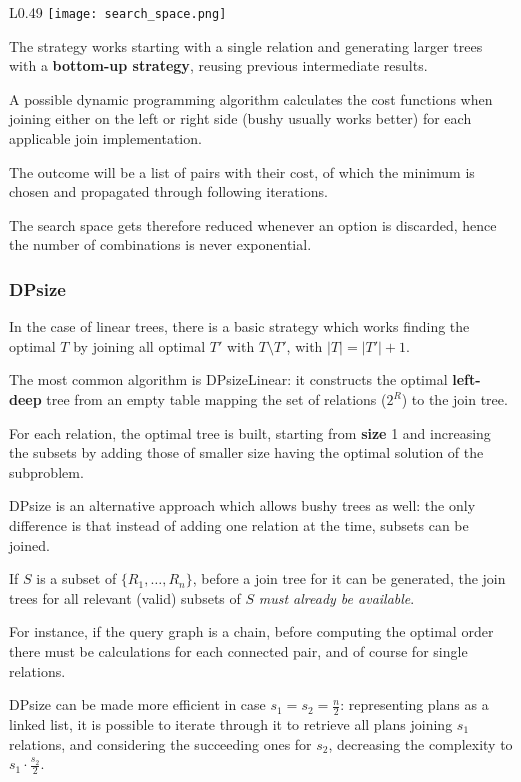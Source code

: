 \begin{wrapfigure}{L}{0.49\textwidth}
	\vspace{-10pt}
	\texttt{[image: search\_space.png]}
	\vspace{-40pt}
\end{wrapfigure}

The strategy works starting with a single relation and generating larger trees with a \textbf{bottom-up strategy}, reusing previous intermediate results.

A possible dynamic programming algorithm calculates the cost functions when joining either on the left or right side (bushy usually works better) for each applicable join implementation. 

The outcome will be a list of pairs with their cost, of which the minimum is chosen and propagated through following iterations.

The search space gets therefore reduced whenever an option is discarded, hence the number of combinations is never exponential.

\subsubsection{DPsize}
In the case of linear trees, there is a basic strategy which works finding the optimal $T$ by joining all optimal $T'$ with $T \setminus T'$, with $|T| = |T'| + 1$.

The most common algorithm is DPsizeLinear: it constructs the optimal \textbf{left-deep} tree from an empty table mapping the set of relations ($2^R$) to the join tree. 

For each relation, the optimal tree is built, starting from \textbf{size} 1 and increasing the subsets by adding those of smaller size having the optimal solution of the subproblem.

DPsize is an alternative approach which allows bushy trees as well: the only difference is that instead of adding one relation at the time, subsets can be joined.

If $S$ is a subset of $\{R_1, \dots, R_n\}$, before a join tree for it can be generated, the join trees for all relevant (valid) subsets of $S$ \textit{must already be available}.

For instance, if the query graph is a chain, before computing the optimal order there must be calculations for each connected pair, and of course for single relations.

DPsize can be made more efficient in case $s_1 = s_2 = \frac{n}{2}$: representing plans as a linked list, it is possible to iterate through it to retrieve all plans joining $s_1$ relations, and considering the succeeding ones for $s_2$, decreasing the complexity to $s_1 \cdot \frac{s_2}{2}$.

